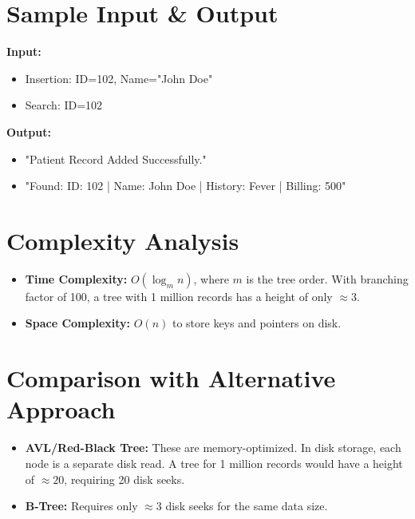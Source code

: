 \documentclass[11pt,a4paper]{article}
\begin{document}
\section{Sample Input \& Output}
\textbf{Input:}
\begin{itemize}[noitemsep]
    \item Insertion: ID=102, Name="John Doe"
    \item Search: ID=102
\end{itemize}
\textbf{Output:}
\begin{itemize}[noitemsep]
    \item "Patient Record Added Successfully."
    \item "Found: ID: 102 | Name: John Doe | History: Fever | Billing: 500"
\end{itemize}

\section{Complexity Analysis}
\begin{itemize}[noitemsep]
    \item \textbf{Time Complexity:} $O(\log_m n)$, where $m$ is the tree order. With branching factor of 100, a tree with 1 million records has a height of only $\approx 3$.
    \item \textbf{Space Complexity:} $O(n)$ to store keys and pointers on disk.
\end{itemize}

\section{Comparison with Alternative Approach}
\begin{itemize}[noitemsep]
    \item \textbf{AVL/Red-Black Tree:} These are memory-optimized. In disk storage, each node is a separate disk read. A tree for 1 million records would have a height of $\approx 20$, requiring 20 disk seeks.
    \item \textbf{B-Tree:} Requires only $\approx 3$ disk seeks for the same data size.
\end{itemize}
\end{document}

